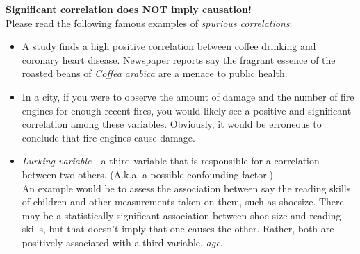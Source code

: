\Large\textbf{Significant correlation does NOT imply causation!}\large\\
Please read the following famous examples of {\em spurious correlations}:
\begin{itemize}
\item A study finds a high positive correlation between coffee drinking and coronary heart disease.  Newspaper reports say the fragrant essence of the roasted beans of {\em Coffea arabica} are a menace to public health.
\item In a city, if you were to observe the amount of damage and the number of fire engines for enough recent fires, you would likely see a positive and significant correlation among these variables.  Obviously, it would be erroneous to conclude that fire engines cause damage.
\item {\em Lurking variable} - a third variable that is responsible for a correlation between two others.  (A.k.a. a possible confounding factor.)\\
An example would be to assess the association between say the reading skills of children and other measurements taken on them, such as shoesize.  There 
may be a statistically significant association between shoe size and reading skills, but that doesn't imply that one causes the other.  Rather, both are positively associated with a third variable, {\em age}.

\newpage


\end{itemize}
